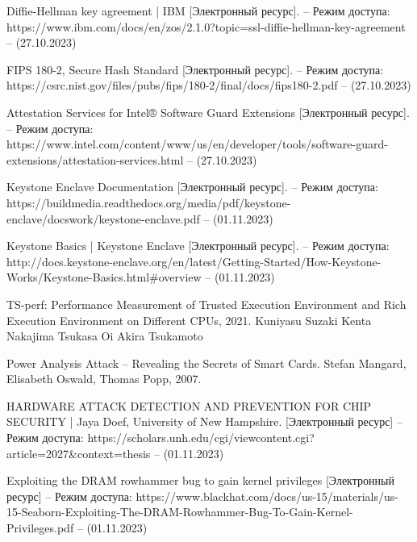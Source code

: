 \begin{thebibliography}{}
Diffie-Hellman key agreement | IBM [Электронный ресурс]. – Режим доступа: https://www.ibm.com/docs/en/zos/2.1.0?topic=ssl-diffie-hellman-key-agreement – (27.10.2023)

FIPS 180-2, Secure Hash Standard [Электронный ресурс]. – Режим доступа: https://csrc.nist.gov/files/pubs/fips/180-2/final/docs/fips180-2.pdf – (27.10.2023)

Attestation Services for Intel® Software Guard Extensions [Электронный ресурс]. – Режим доступа: https://www.intel.com/content/www/us/en/developer/tools/software-guard-extensions/attestation-services.html – (27.10.2023)

Keystone Enclave Documentation [Электронный ресурс]. – Режим доступа: https://buildmedia.readthedocs.org/media/pdf/keystone-enclave/docswork/keystone-enclave.pdf – (01.11.2023)

Keystone Basics | Keystone Enclave [Электронный ресурс]. – Режим доступа: http://docs.keystone-enclave.org/en/latest/Getting-Started/How-Keystone-Works/Keystone-Basics.html\#overview – (01.11.2023)

TS-perf: Performance Measurement of Trusted Execution Environment and Rich Execution Environment on Different CPUs, 2021. Kuniyasu Suzaki Kenta Nakajima Tsukasa Oi Akira Tsukamoto

Power Analysis Attack -- Revealing the Secrets of Smart Cards. Stefan Mangard, Elisabeth Oswald, Thomas Popp, 2007.

HARDWARE ATTACK DETECTION AND PREVENTION FOR CHIP SECURITY | Jaya Doef, University of New Hampshire. [Электронный ресурс] – Режим доступа: https://scholars.unh.edu/cgi/viewcontent.cgi?article=2027\&context=thesis – (01.11.2023)

Exploiting the DRAM rowhammer bug to gain kernel privileges [Электронный ресурс] – Режим доступа: https://www.blackhat.com/docs/us-15/materials/us-15-Seaborn-Exploiting-The-DRAM-Rowhammer-Bug-To-Gain-Kernel-Privileges.pdf – (01.11.2023)

\end{thebibliography}
\endgroup

\pagebreak
